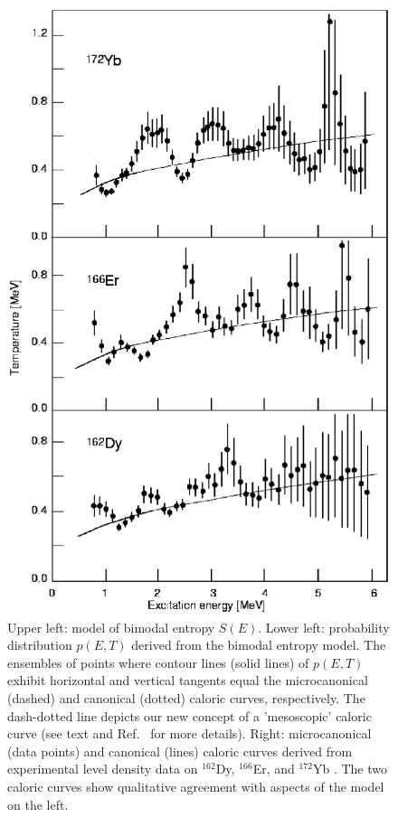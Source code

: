 \documentclass[sort&compress,final,numberedheadings]{aipproc}
\begin{document}
\begin{figure}
\includegraphics[totalheight=8cm,angle=0,bb=65 28 442 619,clip]{fig4b.ps}
\caption{Upper left: model of bimodal entropy $S(E)$. Lower left: probability
distribution $p(E,T)$ derived from the bimodal entropy model. The ensembles of 
points where contour lines (solid lines) of $p(E,T)$ exhibit horizontal and 
vertical tangents equal the microcanonical (dashed) and canonical (dotted) 
caloric curves, respectively. The dash-dotted line depicts our new concept of a
'mesoscopic' caloric curve (see text and Ref.\ \protect\cite{SG03} for more 
details). Right: microcanonical (data points) and canonical (lines) caloric 
curves derived from experimental level density data on $^{162}$Dy, $^{166}$Er, 
and $^{172}$Yb \protect\cite{MB99}. The two caloric curves show qualitative 
agreement with aspects of the model on the left.} 
\label{fig:cal}
\end{figure}
\end{document}
